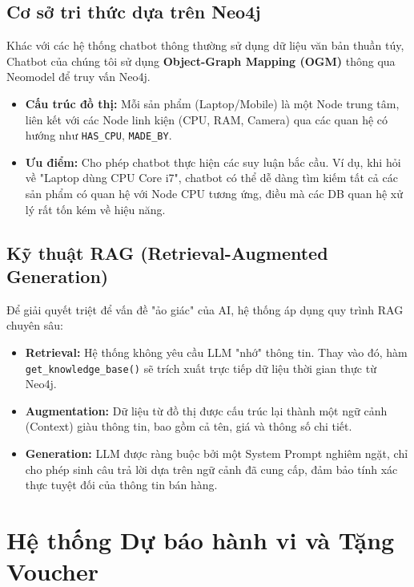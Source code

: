 \documentclass[12pt,a4paper]{report}
\begin{document}
\subsection{Cơ sở tri thức dựa trên Neo4j}
Khác với các hệ thống chatbot thông thường sử dụng dữ liệu văn bản thuần túy, Chatbot của chúng tôi sử dụng \textbf{Object-Graph Mapping (OGM)} thông qua Neomodel để truy vấn Neo4j.
\begin{itemize}
    \item \textbf{Cấu trúc đồ thị:} Mỗi sản phẩm (Laptop/Mobile) là một Node trung tâm, liên kết với các Node linh kiện (CPU, RAM, Camera) qua các quan hệ có hướng như \texttt{HAS\_CPU}, \texttt{MADE\_BY}.
    \item \textbf{Ưu điểm:} Cho phép chatbot thực hiện các suy luận bắc cầu. Ví dụ, khi hỏi về "Laptop dùng CPU Core i7", chatbot có thể dễ dàng tìm kiếm tất cả các sản phẩm có quan hệ với Node CPU tương ứng, điều mà các DB quan hệ xử lý rất tốn kém về hiệu năng.
\end{itemize}

\subsection{Kỹ thuật RAG (Retrieval-Augmented Generation)}
Để giải quyết triệt để vấn đề "ảo giác" của AI, hệ thống áp dụng quy trình RAG chuyên sâu:
\begin{itemize}
    \item \textbf{Retrieval:} Hệ thống không yêu cầu LLM "nhớ" thông tin. Thay vào đó, hàm \texttt{get\_knowledge\_base()} sẽ trích xuất trực tiếp dữ liệu thời gian thực từ Neo4j.
    \item \textbf{Augmentation:} Dữ liệu từ đồ thị được cấu trúc lại thành một ngữ cảnh (Context) giàu thông tin, bao gồm cả tên, giá và thông số chi tiết.
    \item \textbf{Generation:} LLM được ràng buộc bởi một System Prompt nghiêm ngặt, chỉ cho phép sinh câu trả lời dựa trên ngữ cảnh đã cung cấp, đảm bảo tính xác thực tuyệt đối của thông tin bán hàng.
\end{itemize}

\section{Hệ thống Dự báo hành vi và Tặng Voucher}
\end{document}
